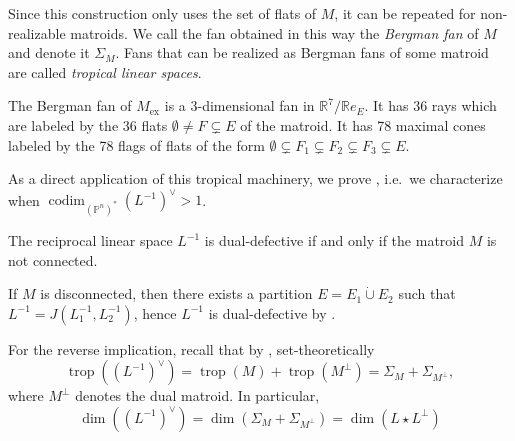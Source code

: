 \documentclass[12pt,a4paper,english]{scrartcl}
\newcommand{\RR}{\mathbb{R}}
\newcommand{\PP}{\mathbb{P}}
\DeclareMathOperator{\codim}{codim}
\DeclareMathOperator{\trop}{trop}
\begin{document}
Since this construction only uses the set of flats of $M$, it can be repeated for non-realizable matroids. We call the fan obtained in this way the \textit{Bergman fan} of $M$ and denote it $\Sigma_M$. Fans that can be realized as Bergman fans of some matroid are called \textit{tropical linear spaces}.

\begin{example}
The Bergman fan of $M_{\text{ex}}$ is a $3$-dimensional fan in $\RR^7/\RR e_E$. It has 36 rays which are labeled by the 36 flats $\emptyset \neq F \subsetneq E$ of the matroid. It has 78 maximal cones labeled by the 78 flags of flats of the form $\emptyset \subsetneq F_1 \subsetneq F_2 \subsetneq F_3 \subsetneq E$.
\end{example}

As a direct application of this tropical machinery, we prove , i.e.\ we characterize when $\codim_{(\PP^n)^*} (L^{-1})^\vee > 1$.

\begin{theorem}\label{thm: defectiveness}
    The reciprocal linear space $L^{-1}$ is dual-defective if and only if the matroid $M$ is not connected.
\end{theorem}

\begin{remark}\label{rmk: easydirectionofdualdef}
If $M$ is disconnected, then there exists a partition $E = E_1 \mathbin{\dot\cup} E_2$ such that $L^{-1} = J(L_1^{-1},L_2^{-1})$, hence $L^{-1}$ is dual-defective by .
\end{remark}


For the reverse implication, recall that by , set-theoretically
\[
\trop((L^{-1})^\vee) = \trop(M) + \trop(M^\perp) = \Sigma_M + \Sigma_{M^\perp},
\]
where $M^\perp$ denotes the dual matroid. In particular,
\begin{equation}\label{eq: tropDual}
\dim ((L^{-1})^\vee) = \dim(\Sigma_M + \Sigma_{M^\perp}) = \dim(L \star L^\perp)
\end{equation}

\end{document}
